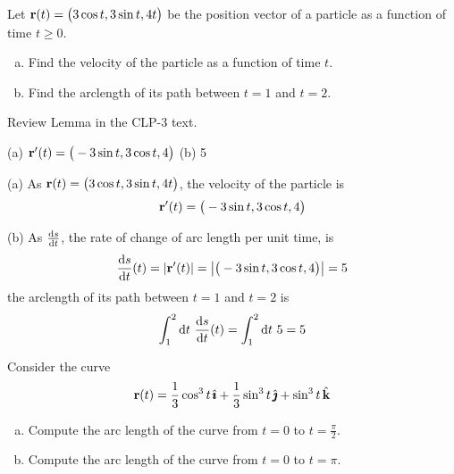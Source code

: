 \begin{question}[M317 2010D]  %
Let $\mathbf{r}(t) = \big(3 \cos t, 3 \sin t, 4t\big)$ be the position vector 
of a particle as a function of time $t \ge 0$.
\begin{enumerate}[(a)]
\item
Find the velocity of the particle as a function of time $t$.
\item
Find the arclength of its path between $t = 1$ and $t = 2$.
\end{enumerate}
\end{question}

\begin{hint} 
Review Lemma  in the CLP-3 text.
\end{hint}

\begin{answer} 
(a) $\mathbf{r}'(t) = \big(-3 \sin t, 3 \cos t, 4\big)$\qquad
(b) 5
\end{answer}

\begin{solution} (a) As $\mathbf{r}(t) = \big(3 \cos t, 3 \sin t, 4t\big)$,
the velocity of the particle is
\begin{equation*}
\mathbf{r}'(t) = \big(-3 \sin t, 3 \cos t, 4\big)
\end{equation*}

\noindent (b) As $\diff{s}{t}$, the rate of change of arc length per unit time,
is
\begin{equation*}
\diff{s}{t}(t) = |\vr'(t)| = \big|\big(-3 \sin t, 3 \cos t, 4\big)\big|
  =5
\end{equation*}
the arclength of its path between $t = 1$ and $t = 2$ is
\begin{equation*}
\int_1^2\dee{t}\ \diff{s}{t}(t) 
=\int_1^2\dee{t}\ 5
=5
\end{equation*}
\end{solution}


\begin{question}[M317 2007A] %
	Consider the curve
	\begin{equation*}
	\mathbf{r}(t) = \frac{1}{3}\cos^3 t\,\hat{\pmb{\imath}} +\frac{1}{3} \sin^3 t\,\hat{\pmb{\jmath}} + \sin^3 t\,\hat{\mathbf{k}}
	\end{equation*}
	\begin{enumerate}[(a)]
		\item
		Compute the arc length of the curve from $t = 0$ to $t = \frac{\pi}{2}$.
		\item
		Compute the arc length of the curve from $t = 0$ to $t = \pi$.
	\end{enumerate}
\end{question}


